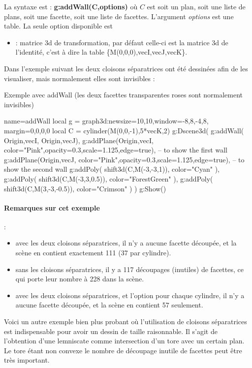 La syntaxe est : \textbf{g:addWall(C,options)} où $C$ est soit un plan, soit une liste de plans, soit une facette, soit une liste de facettes. L'argument \emph{options} est une table. La seule option disponible est 
\begin{itemize}
    \item {} : matrice 3d de transformation, par défaut celle-ci est la matrice 3d de l'identité, c'est à dire la table \{M(0,0,0),vecI,vecJ,vecK\}.
\end{itemize}

Dans l'exemple suivant les deux cloisons séparatrices ont été dessinées afin de les visualiser, mais normalement elles sont invisibles :
\begin{demo}{Exemple avec addWall (les deux facettes transparentes roses sont normalement invisibles)}
\begin{luadraw}{name=addWall}
local g = graph3d:new{size={10,10},window={-8,8,-4,8}, margin={0,0,0,0}}
local C = cylinder(M(0,0,-1),5*vecK,2)
g:Dscene3d(
    g:addWall( {{Origin,vecI}, {Origin,vecJ}}),
    g:addPlane({Origin,vecI}, {color="Pink",opacity=0.3,scale=1.125,edge=true}), -- to show the first wall
    g:addPlane({Origin,vecJ}, {color="Pink",opacity=0.3,scale=1.125,edge=true}), -- to show the second wall
    g:addPoly( shift3d(C,M(-3,-3,1)), {color="Cyan"} ),
    g:addPoly( shift3d(C,M(-3,3,0.5)), {color="ForestGreen"} ),
    g:addPoly( shift3d(C,M(3,-3,-0.5)), {color="Crimson"} )
)
g:Show()
\end{luadraw}
\end{demo}

\paragraph{Remarques sur cet exemple} : 
\begin{itemize}
    \item avec les deux cloisons séparatrices, il n'y a aucune facette découpée, et la scène en contient exactement 111 (37 par cylindre).
    \item sans les cloisons séparatrices, il y a 117 découpages (inutiles) de facettes, ce qui porte leur nombre à 228 dans la scène.
        \item avec les deux cloisons séparatrices, et l'option  pour chaque cylindre, il n'y a aucune facette découpée, et la scène en contient 57 seulement.
\end{itemize}

Voici un autre exemple bien plus probant où l'utilisation de cloisons séparatrices est indispensable pour avoir un dessin de taille raisonnable. Il s'agit de l'obtention d'une lemniscate comme intersection d'un tore avec un certain plan. Le tore étant non convexe le nombre de découpage inutile de facettes peut être très important.

